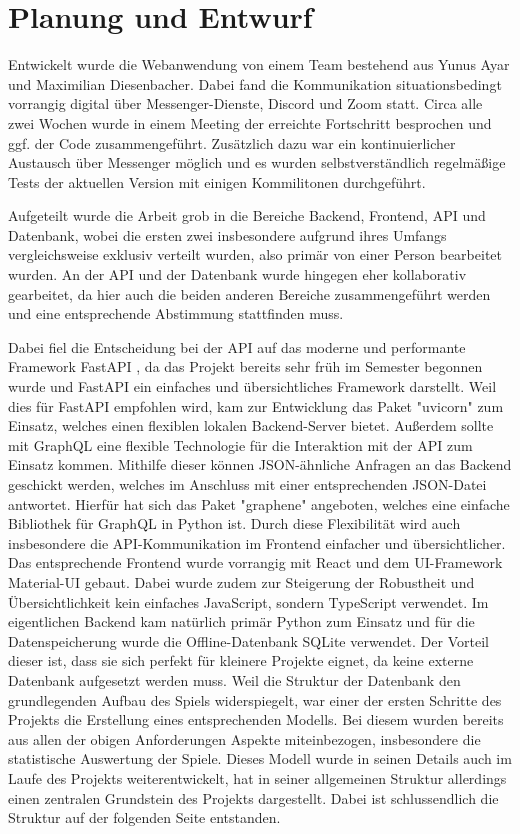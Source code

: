 \section{Planung und Entwurf}

Entwickelt wurde die Webanwendung von einem Team bestehend aus Yunus Ayar und Maximilian Diesenbacher. Dabei fand die Kommunikation situationsbedingt vorrangig digital über Messenger-Dienste, Discord und Zoom statt. Circa alle zwei Wochen wurde in einem Meeting der erreichte Fortschritt besprochen und ggf. der Code zusammengeführt. Zusätzlich dazu war ein kontinuierlicher Austausch über Messenger möglich und es wurden selbstverständlich regelmäßige Tests der aktuellen Version mit einigen Kommilitonen durchgeführt.

Aufgeteilt wurde die Arbeit grob in die Bereiche Backend, Frontend, API und Datenbank, wobei die ersten zwei insbesondere aufgrund ihres Umfangs vergleichsweise exklusiv verteilt wurden, also primär von einer Person bearbeitet wurden. An der API und der Datenbank wurde hingegen eher kollaborativ gearbeitet, da hier auch die beiden anderen Bereiche zusammengeführt werden und eine entsprechende Abstimmung stattfinden muss.

Dabei fiel die Entscheidung bei der API auf das moderne und performante Framework FastAPI \cite{fastapi}, da das Projekt bereits sehr früh im Semester begonnen wurde und FastAPI ein einfaches und übersichtliches Framework darstellt. Weil dies für FastAPI empfohlen wird, kam zur Entwicklung das Paket "uvicorn" \cite{uvicorn} zum Einsatz, welches einen flexiblen lokalen Backend-Server bietet. Außerdem sollte mit GraphQL \cite{graphql} eine flexible Technologie für die Interaktion mit der API zum Einsatz kommen. Mithilfe dieser können JSON-ähnliche Anfragen an das Backend geschickt werden, welches im Anschluss mit einer entsprechenden JSON-Datei antwortet. Hierfür hat sich das Paket "graphene" \cite{graphene} angeboten, welches eine einfache Bibliothek für GraphQL in Python ist. Durch diese Flexibilität wird auch insbesondere die API-Kommunikation im Frontend einfacher und übersichtlicher. Das entsprechende Frontend wurde vorrangig mit React \cite{react} und dem UI-Framework Material-UI \cite{material-ui} gebaut. Dabei wurde zudem zur Steigerung der Robustheit und Übersichtlichkeit kein einfaches JavaScript, sondern TypeScript verwendet. Im eigentlichen Backend kam natürlich primär Python zum Einsatz und für die Datenspeicherung wurde die Offline-Datenbank SQLite \cite{sqlite} verwendet. Der Vorteil dieser ist, dass sie sich perfekt für kleinere Projekte eignet, da keine externe Datenbank aufgesetzt werden muss. Weil die Struktur der Datenbank den grundlegenden Aufbau des Spiels widerspiegelt, war einer der ersten Schritte des Projekts die Erstellung eines entsprechenden Modells. Bei diesem wurden bereits aus allen der obigen Anforderungen Aspekte miteinbezogen, insbesondere die statistische Auswertung der Spiele. Dieses Modell wurde in seinen Details auch im Laufe des Projekts weiterentwickelt, hat in seiner allgemeinen Struktur allerdings einen zentralen Grundstein des Projekts dargestellt. Dabei ist schlussendlich die Struktur auf der folgenden Seite entstanden.

